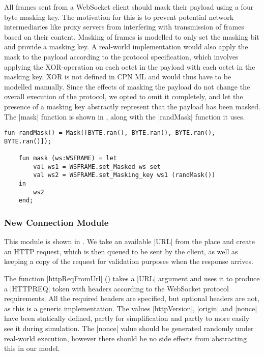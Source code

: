 	All frames sent from a WebSocket client should mask their payload using a four
	byte masking key.
	The motivation for this is to prevent potential network intermediaries like proxy
	servers from interfering with transmission of frames based on their content.
	Masking of frames is modelled to only set the masking bit and provide a
	masking key. A real-world implementation would also apply the mask to the
	payload according to the protocol specification, which involves applying the
	XOR-operation on each octet in the payload with each octet in the masking key.
	XOR is not defined in CPN ML and would thus have to be modelled manually. Since
	the effects of masking the payload do not change the overall execution of the
	protocol, we opted to omit it completely, and let the presence of a masking key
	abstractly represent that the payload has been masked. The |mask| function is
	shown in , along with the |randMask| function it uses.
	
	\begin{lstlisting}[label=lst:mask_fun,caption=Masking functions
	,gobble=1,float=h]
	fun randMask() = Mask([BYTE.ran(), BYTE.ran(), BYTE.ran(), BYTE.ran()]);
  
	fun mask (ws:WSFRAME) = let
		val ws1 = WSFRAME.set_Masked ws set
		val ws2 = WSFRAME.set_Masking_key ws1 (randMask())
	in 
		ws2
	end;
	\end{lstlisting}
     
	\subsubsection{New Connection Module}
		
		
		This module is shown in . We take an available |URL| from the
		 place and create an HTTP request, which is then
		queued to be sent by the client, as well as keeping a copy of the request for
		validation purposes when the response arrives.
		
		The function |httpReqFromUrl| () takes a |URL| argument
		and uses it to produce a |HTTPREQ| token with headers according to the WebSocket
		protocol requirements. 
		All the required headers are specified, but optional headers are not, as this
		is a generic implementation. The values |httpVersion|, |origin| and |nonce|
		have been statically defined, partly for simplification and partly to more
		easily see it during simulation. The |nonce| value should be generated
		randomly under real-world execution, however there should be no side effects
		from abstracting this in our model.

